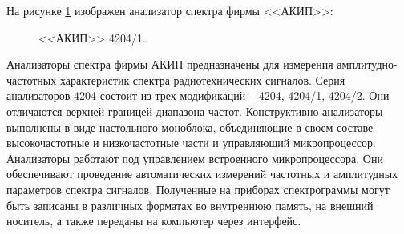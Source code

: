 На рисунке \ref{fig:picture8} изображен анализатор спектра фирмы <<АКИП>>:

\begin{figure}[ht]
	\caption{<<АКИП>> 4204/1.}\label{fig:picture8}
\end{figure}

Анализаторы спектра фирмы АКИП предназначены для измерения амплитудно-частотных характеристик спектра радиотехнических сигналов. Серия анализаторов 4204 состоит из трех модификаций – 4204, 4204/1, 4204/2. Они отличаются верхней границей диапазона частот. Конструктивно анализаторы выполнены в виде настольного моноблока, объединяющие в своем составе высокочастотные и низкочастотные части и управляющий микропроцессор. Анализаторы работают под управлением встроенного микропроцессора. Они обеспечивают проведение автоматических измерений частотных и амплитудных параметров спектра сигналов. Полученные на приборах спектрограммы могут быть записаны в различных форматах во внутреннюю память, на внешний носитель, а также переданы на компьютер через интерфейс. 

